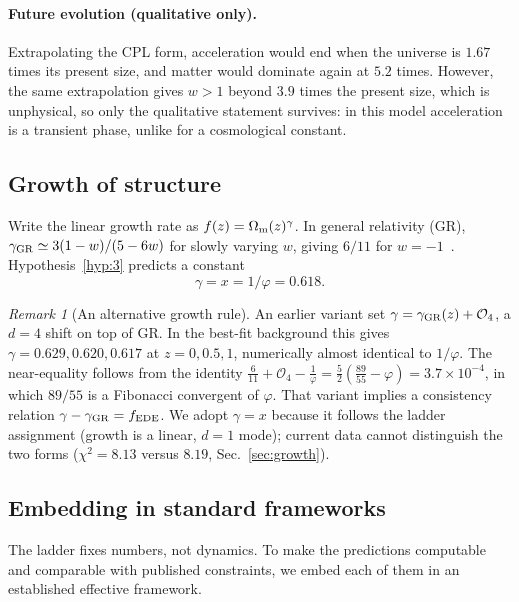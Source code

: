 \documentclass[11pt]{article}
\theoremstyle{definition}
\theoremstyle{remark}
\newtheorem{remark}{Remark}
\newcommand{\gr}{\varphi}
\newcommand{\Om}{\Omega_{\rm m}}
\newcommand{\fede}{f_{\rm EDE}}
\begin{document}
\paragraph{Future evolution (qualitative only).} Extrapolating the CPL form, acceleration would end when the universe is $1.67$ times its present size, and matter would dominate again at $5.2$ times. However, the same extrapolation gives $w > 1$ beyond $3.9$ times the present size, which is unphysical, so only the qualitative statement survives: in this model acceleration is a transient phase, unlike for a cosmological constant.

\subsection{Growth of structure}

Write the linear growth rate as $f(z) = \Om(z)^{\gamma}$. In general relativity (GR), $\gamma_{\rm GR} \simeq 3(1-w)/(5-6w)$ for slowly varying $w$, giving $6/11$ for $w = -1$~\cite{WangSteinhardt,Linder05}. Hypothesis~\ref{hyp:3} predicts a constant
\begin{equation}
\gamma = x = 1/\gr = 0.618 .
\end{equation}

\begin{remark}[An alternative growth rule]\label{rem:alt}
An earlier variant set $\gamma = \gamma_{\rm GR}(z) + \mathcal O_4$, a $d = 4$ shift on top of GR. In the best-fit background this gives $\gamma = 0.629, 0.620, 0.617$ at $z = 0, 0.5, 1$, numerically almost identical to $1/\gr$. The near-equality follows from the identity $\tfrac{6}{11} + \mathcal O_4 - \tfrac1\gr = \tfrac52\left(\tfrac{89}{55} - \gr\right) = 3.7\times10^{-4}$, in which $89/55$ is a Fibonacci convergent of $\gr$. That variant implies a consistency relation $\gamma - \gamma_{\rm GR} = \fede$. We adopt $\gamma = x$ because it follows the ladder assignment (growth is a linear, $d = 1$ mode); current data cannot distinguish the two forms ($\chi^2 = 8.13$ versus $8.19$, Sec.~\ref{sec:growth}).
\end{remark}

\subsection{Embedding in standard frameworks}\label{sec:embed}

The ladder fixes numbers, not dynamics. To make the predictions computable and comparable with published constraints, we embed each of them in an established effective framework.
\end{document}
